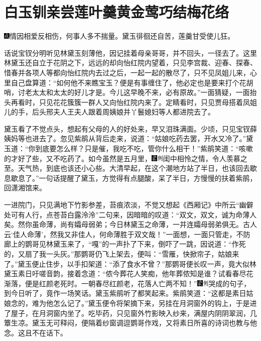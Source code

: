 

\chapter{白玉钏亲尝莲叶羹\hspace{.5em}黄金莺巧结梅花络}

{\includegraphics[width=3mm]{../Images/00005}情因相爱反相伤，何事人多不揣量。黛玉徘徊还自苦，莲羹甘受使儿狂。}

话说宝钗分明听见林黛玉刻薄他，因记挂着母亲哥哥，并不回头，一径去了。这里林黛玉还自立于花阴之下，远远的却向怡红院内望着，只见李宫裁、迎春、探春、惜春并各项人等都向怡红院内去过之后，一起一起的散尽了，只不见凤姐儿来，心里自己盘算道：``如何他不来瞧宝玉？便是有事缠住了，他必定也是要来打个花胡哨，讨老太太和太太的好儿才是。今儿这早晚不来，必有原故。''一面猜疑，一面抬头再看时，只见花花簇簇一群人又向怡红院内来了。定睛看时，只见贾母搭着凤姐儿的手，后头邢夫人王夫人跟着周姨娘并丫鬟媳妇等人都进院去了。

黛玉看了不觉点头，想起有父母的人的好处来，早又泪珠满面。少顷，只见宝钗薛姨妈等也进去了。忽见紫鹃从背后走来，说道：``姑娘吃药去罢，开水又冷了。''黛玉道：``你到底要怎么样？只是催，我吃不吃，管你什么相干！''紫鹃笑道：``咳嗽的才好了些，又不吃药了。如今虽然是五月里，{\includegraphics[width=3mm]{../Images/00006}\includegraphics[width=3mm]{../Images/00011}\footnotesize \kaishu 闺中相怜之情，令人羡慕之至。}天气热，到底也该还小心些。大清早起，在这个潮地方站了半日，也该回去歇息歇息了。''一句话提醒了黛玉，方觉得有点腿酸，呆了半日，方慢慢的扶着紫鹃，回潇湘馆来。

一进院门，只见满地下竹影参差，苔痕浓淡，不觉又想起《西厢记》中所云``幽僻处可有人行，点苍苔白露泠泠''二句来，因暗暗的叹道：``双文，双文，诚为命薄人矣。然你虽命薄，尚有孀母弱弟；今日林黛玉之命薄，一并连孀母弱弟俱无。古人云`佳人命薄'，然我又非佳人，何命薄胜于双文哉！''一面想，一面只管走，不防廊上的鹦哥见林黛玉来了，``嘎''的一声扑了下来，倒吓了一跳，因说道：``作死的，又扇了我一头灰。''那鹦哥仍飞上架去，便叫：``雪雁，快掀帘子，姑娘来了。''黛玉便止住步，以手扣架道：``添了食水不曾？''那鹦哥便长叹一声，竟大似林黛玉素日吁嗟音韵，接着念道：``侬今葬花人笑痴，他年葬侬知是谁？试看春尽花渐落，便是红颜老死时。一朝春尽红颜老，花落人亡两不知！''{\includegraphics[width=3mm]{../Images/00006}\includegraphics[width=3mm]{../Images/00011}\footnotesize \kaishu 哭成的句子，到今日听了，竟作一场笑话。}黛玉紫鹃听了都笑起来。紫鹃笑道：``这都是素日姑娘念的，难为他怎么记了。''黛玉便令将架摘下来，另挂在月洞窗外的钩上，于是进了屋子，在月洞窗内坐了。吃毕药，只见窗外竹影映入纱来，满屋内阴阴翠润，几簟生凉。黛玉无可释闷，便隔着纱窗调逗鹦哥作戏，又将素日所喜的诗词也教与他念。这且不在话下。

